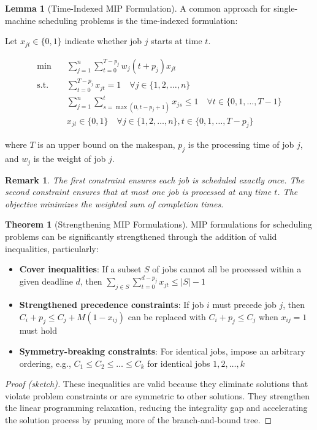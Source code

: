 \documentclass{article}
\newtheorem{remark}{Remark}
\theoremstyle{definition}
\newtheorem{theorem}{Theorem}
\newtheorem{lemma}{Lemma}
\begin{document}
\begin{lemma}[Time-Indexed MIP Formulation]
A common approach for single-machine scheduling problems is the time-indexed formulation:

Let $x_{jt} \in \{0, 1\}$ indicate whether job $j$ starts at time $t$.

\begin{align}
\min \quad & \sum_{j=1}^{n} \sum_{t=0}^{T-p_j} w_j(t + p_j)x_{jt} \\
\text{s.t.} \quad & \sum_{t=0}^{T-p_j} x_{jt} = 1 \quad \forall j \in \{1, 2, \ldots, n\} \\
& \sum_{j=1}^{n} \sum_{s=\max(0, t-p_j+1)}^{t} x_{js} \leq 1 \quad \forall t \in \{0, 1, \ldots, T-1\} \\
& x_{jt} \in \{0, 1\} \quad \forall j \in \{1, 2, \ldots, n\}, t \in \{0, 1, \ldots, T-p_j\}
\end{align}

where $T$ is an upper bound on the makespan, $p_j$ is the processing time of job $j$, and $w_j$ is the weight of job $j$.

\begin{remark}
The first constraint ensures each job is scheduled exactly once. The second constraint ensures that at most one job is processed at any time $t$. The objective minimizes the weighted sum of completion times.
\end{remark}
\end{lemma}

\begin{theorem}[Strengthening MIP Formulations]
MIP formulations for scheduling problems can be significantly strengthened through the addition of valid inequalities, particularly:

\begin{itemize}
    \item \textbf{Cover inequalities}: If a subset $S$ of jobs cannot all be processed within a given deadline $d$, then $\sum_{j \in S} \sum_{t=0}^{d-p_j} x_{jt} \leq |S|-1$
    
    \item \textbf{Strengthened precedence constraints}: If job $i$ must precede job $j$, then $C_i + p_j \leq C_j + M(1-x_{ij})$ can be replaced with $C_i + p_j \leq C_j$ when $x_{ij}=1$ must hold
    
    \item \textbf{Symmetry-breaking constraints}: For identical jobs, impose an arbitrary ordering, e.g., $C_1 \leq C_2 \leq \ldots \leq C_k$ for identical jobs $1, 2, \ldots, k$
\end{itemize}

\begin{proof}[Proof (sketch)]
These inequalities are valid because they eliminate solutions that violate problem constraints or are symmetric to other solutions. They strengthen the linear programming relaxation, reducing the integrality gap and accelerating the solution process by pruning more of the branch-and-bound tree.
\end{proof}
\end{theorem}
\end{document}
